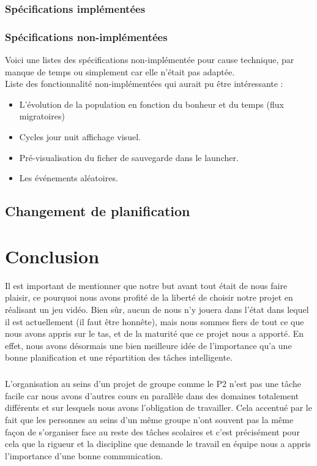 \documentclass[a4paper,10pt,openany,oneside]{report}
\begin{document}
\subsection{Spécifications implémentées}
\subsection{Spécifications non-implémentées}
Voici une listes des spécifications non-implémentée pour cause technique, par manque de temps ou simplement car elle n'était pas adaptée. \\
Liste des fonctionnalité non-implémentées qui aurait pu être intéressante :
\begin{itemize}
	\item L'évolution de la population en fonction du bonheur et du temps (flux migratoires)
	\item Cycles jour nuit affichage visuel.
	\item Pré-visualisation du ficher de sauvegarde dans le launcher.
	\item Les événements aléatoires.
\end{itemize}

\section{Changement de planification}


\chapter{Conclusion}
\thispagestyle{headings}
Il est important de mentionner que notre but avant tout était de nous faire plaisir, ce pourquoi nous avons profité de la liberté de choisir notre projet en réalisant un jeu vidéo. Bien sûr, aucun de nous n'y jouera dans l'état dans lequel il est actuellement (il faut être honnête), mais nous sommes fiers de tout ce que nous avons appris sur le tas, et de la maturité que ce projet nous a apporté. En effet, nous avons désormais une bien meilleure idée de l'importance qu'a une bonne planification et une répartition des tâches intelligente.
\paragraph{}
L'organisation au seins d'un projet de groupe comme le P2 n'est pas une tâche facile car nous avons d'autres cours en parallèle dans des domaines totalement différents et sur lesquels nous avons l'obligation de travailler. Cela accentué par le fait que les personnes au seins d'un même groupe n'ont souvent pas la même façon de s'organiser face au reste des tâches scolaires et c'est précisément pour cela que la rigueur et la discipline que demande le travail en équipe nous a appris l'importance d'une bonne communication.
\end{document}
